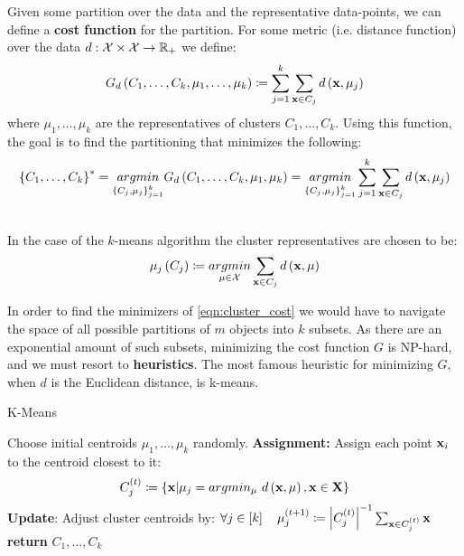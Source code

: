 Given some partition over the data and the representative data-points, we can define a \textbf{cost function} for the partition. For some metric (i.e. distance function) over the data $d:\mathcal{X}\times\mathcal{X}\rightarrow \mathbb{R}_+$ we define:
\begin{equation}
G_d\left(C_1,\ldots,C_k, \mu_1,\ldots,\mu_k\right) \coloneqq \sum_{j=1}^k \sum_{\mathbf{x}\in C_j} d\left(\mathbf{x},\mu_j\right)
\end{equation}
where $\mu_1,\ldots,\mu_k$ are the representatives of clusters $C_1,\ldots,C_k$. Using this function, the goal is to find the partitioning that minimizes the following:
\begin{equation}
\left\{C_1,\ldots,C_k\right\}^* = \underset{\left\{C_j,\mu_j\right\}_{j=1}^k}{argmin} G_d\left(C_1,\ldots,C_k,\mu_1,\mu_k\right) = \underset{\left\{C_j,\mu_j\right\}_{j=1}^k}{argmin} \sum_{j=1}^k \sum_{\mathbf{x}\in C_j} d\left(\mathbf{x},\mu_j\right)
\label{eqn:cluster_cost}
\end{equation}

~\\In the case of the $k$-means algorithm the cluster representatives are chosen to be: $$ \mu_j\left(C_j\right) \coloneqq \underset{\mu\in\mathcal{X}}{argmin}\sum_{\mathbf{x}\in C_j} d\left(\mathbf{x},\mu\right)  $$

In order to find the minimizers of \ref{eqn:cluster_cost} we would have to navigate the space of all possible partitions of $m$ objects into $k$ subsets. As there are an exponential amount of such subsets, minimizing the cost function $G$ is NP-hard, and we must resort to \textbf{heuristics}. The most famous heuristic for minimizing $G$, when $d$ is the Euclidean distance, is k-means.

\begin{algorithm}
	\caption{K-Means}\label{kmeans_pseudo}
	\begin{algorithmic}
		\State Choose initial centroids $\mu_1,\ldots,\mu_k$ randomly.
			\State \textbf{Assignment:} Assign each point $\mathbf{x}_i$ to the centroid closest to it: $$ C_j^{\left(t\right)}\coloneqq \left\{\mathbf{x} | \mu_j = argmin_{\mu}\,\,d\left(\mathbf{x},\mu\right),\mathbf{x}\in\mathbf{X}\right\} $$
			\State \textbf{Update}: Adjust cluster centroids by: $ \forall j\in\left[k\right] \quad \mu_j^{\left(t+1\right)} \coloneqq \left|C_j^{\left(t\right)}\right|^{-1}\sum_{\mathbf{x}\in C_j^{\left(t\right)}}\mathbf{x} $
		\EndWhile
		\State \textbf{return} $C_1,\ldots,C_k$
		\EndProcedure
	\end{algorithmic}
\end{algorithm}


